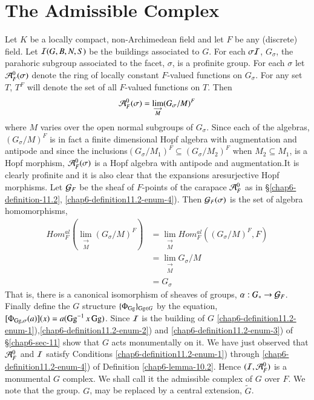 \section*{The Admissible Complex}
Let $K$ be a locally compact, non-Archimedean field and let $F$ be any (discrete) field. Let $\mathcal{I}(G, B, N, S)$ be the buildings associated to $G$. For each $\sigma \mathcal{I}$, $G_{\sigma}$, the parahoric subgroup associated to the facet, $\sigma$, is a profinite group. For each $\sigma$ let $\mathcal{A}_{F}^{0}(\sigma)$ denote the ring of locally constant $F$-valued functions on $G_{\sigma}$. For any set $T$, $T^{F}$ will denote the set of all $F$-valued functions on $T$. Then
$$
\mathcal{A}_{F}^{0}(\sigma) = \lim\limits_{\substack{\longrightarrow \\ M}}(G_\sigma/M)^{F} 
$$
where $M$ varies over the open normal subgroups of $G_{\sigma}$. Since each of the algebras, $(G_{\sigma}/M)^{F}$ is in fact a finite dimensional Hopf algebra with augmentation and antipode and since the inclusions$(G_{\sigma}/M_{1})^{F}\subseteq (G_{\sigma}/M_{2})^{F}$ when $M_{2} \subseteq M_{1}$, is a Hopf morphism, $\mathcal{A}_{F}^{0}(\sigma)$ is a Hopf algebra with antipode and augmentation.It is clearly profinite and it is also clear that the expansions are\pageoriginale surjective Hopf morphisms. Let $\mathcal{G}_{F}$ be the sheaf of $F$-points of the carapace $\mathcal{A}_{F}^{0}$ as in \S\ref{chap6-definition-11.2}, \ref{chap6-definition11.2-enum-4}). Then $\mathcal{G}_{F}(\sigma)$ is the set of algebra homomorphisms,
\begin{align*}
Hom_{F}^{al}(\lim\limits_{\substack{\longrightarrow \\ M}}(G_\sigma/M)^{F}) &= \lim\limits_{\substack{\longrightarrow \\                                                  M}} Hom_{F}^{al}((G_{\sigma}/M)^{F}, F)\\
&=\lim\limits_{\substack{\longrightarrow \\ M}} G_{\sigma}/M\\
&=G_{\sigma}
\end{align*}
That is, there is a canonical isomorphism of sheaves of groups, $\alpha : G_{*} \rightarrow \mathcal{G}_{F}$. Finally define the $G$ structure $\{\Phi_{\operatorname{Gg}}\}_{\operatorname{Gg} \in G}$ by the equation, $[\Phi_{\operatorname{Gg}, \sigma}(a)](x) = a(\operatorname{Gg} ^{-1}x\operatorname{Gg})$. Since $\mathcal{I}$ is the building of $G$ \ref{chap6-definition11.2-enum-1}),\ref{chap6-definition11.2-enum-2}) and \ref{chap6-definition11.2-enum-3}) of \S \ref{chap6-sec-11} show that $G$ acts monumentally on it. We have just observed that $\mathcal{A}_{F}^{0}$ and $\mathcal{I}$ satisfy Conditions \ref{chap6-definition11.2-enum-1}) through \ref{chap6-definition11.2-enum-4}) of Definition \ref{chap6-lemma-10.2}. Hence $(\mathcal{I}, \mathcal{A}_{F}^{0})$ is a monumental $G$ complex. We shall call it the admissible complex of $G$ over $F$. We note that the group. $G$, may be replaced by a central extension, $\tilde{G}$. 

